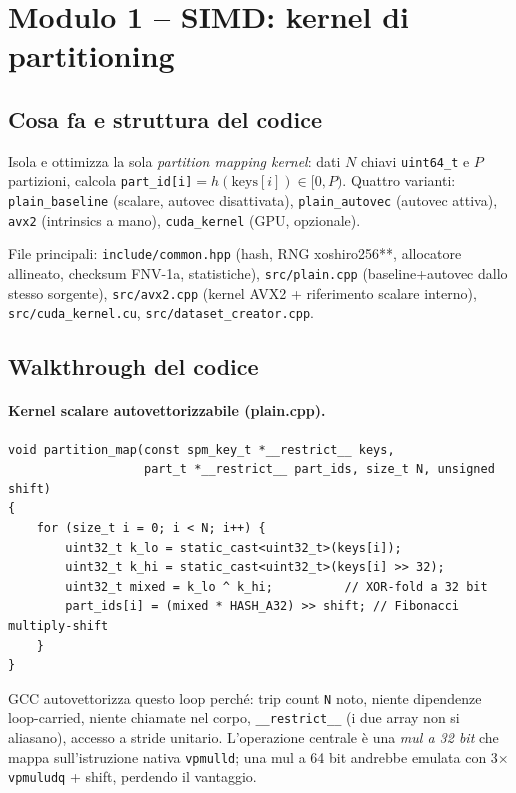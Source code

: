\documentclass[11pt,a4paper]{article}
\begin{document}
\section{Modulo 1 -- SIMD: kernel di partitioning}

\subsection{Cosa fa e struttura del codice}

Isola e ottimizza la sola \emph{partition mapping kernel}: dati $N$ chiavi \texttt{uint64\_t} e $P$ partizioni, calcola \texttt{part\_id[i]}$=h(\text{keys}[i])\in[0,P)$. Quattro varianti: \texttt{plain\_baseline} (scalare, autovec disattivata), \texttt{plain\_autovec} (autovec attiva), \texttt{avx2} (intrinsics a mano), \texttt{cuda\_kernel} (GPU, opzionale).

File principali: \texttt{include/common.hpp} (hash, RNG xoshiro256**, allocatore allineato, checksum FNV-1a, statistiche), \texttt{src/plain.cpp} (baseline+autovec dallo stesso sorgente), \texttt{src/avx2.cpp} (kernel AVX2 + riferimento scalare interno), \texttt{src/cuda\_kernel.cu}, \texttt{src/dataset\_creator.cpp}.

\subsection{Walkthrough del codice}

\paragraph{Kernel scalare autovettorizzabile (plain.cpp).}

\begin{lstlisting}[style=cpp]
void partition_map(const spm_key_t *__restrict__ keys,
                   part_t *__restrict__ part_ids, size_t N, unsigned shift)
{
    for (size_t i = 0; i < N; i++) {
        uint32_t k_lo = static_cast<uint32_t>(keys[i]);
        uint32_t k_hi = static_cast<uint32_t>(keys[i] >> 32);
        uint32_t mixed = k_lo ^ k_hi;          // XOR-fold a 32 bit
        part_ids[i] = (mixed * HASH_A32) >> shift; // Fibonacci multiply-shift
    }
}
\end{lstlisting}

\begin{whybox}
GCC autovettorizza questo loop perché: trip count \texttt{N} noto, niente dipendenze loop-carried, niente chiamate nel corpo, \texttt{\_\_restrict\_\_} (i due array non si aliasano), accesso a stride unitario. L'operazione centrale è una \emph{mul a 32 bit} che mappa sull'istruzione nativa \texttt{vpmulld}; una mul a 64 bit andrebbe emulata con 3$\times$ \texttt{vpmuludq} + shift, perdendo il vantaggio.
\end{whybox}
\end{document}
